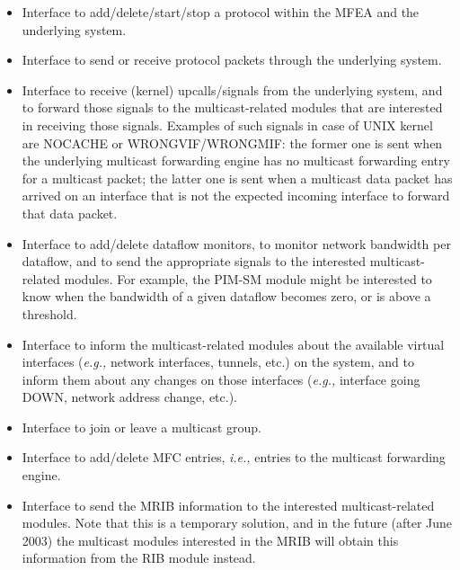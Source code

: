 \documentclass[11pt]{article}
\newcommand{\ie}{\emph{i.e.,}\xspace}
\newcommand{\eg}{\emph{e.g.,}\xspace}
\begin{document}
\begin{itemize}

  \item Interface to add/delete/start/stop a protocol within the MFEA
  and the underlying system.

  \item Interface to send or receive protocol packets through the
  underlying system.

  \item Interface to receive (kernel) upcalls/signals from the
  underlying system, and to forward those signals to the
  multicast-related modules that are interested in receiving those
  signals. Examples of such signals in case of UNIX kernel are NOCACHE or
  WRONGVIF/WRONGMIF: the former one is sent when the underlying multicast
  forwarding engine has no multicast forwarding entry for a multicast
  packet; the latter one is sent when a multicast data packet has
  arrived on an interface that is not the expected incoming interface to
  forward that data packet.

  \item Interface to add/delete dataflow monitors, to monitor network
  bandwidth per dataflow, and to send the appropriate signals to the
  interested multicast-related modules. For example, the PIM-SM module
  might be interested to know when the bandwidth of a given dataflow becomes
  zero, or is above a threshold.

  \item Interface to inform the multicast-related modules about the
  available virtual interfaces (\eg network interfaces, tunnels, etc.) on
  the system, and to inform them about any changes on those interfaces
  (\eg interface going DOWN, network address change, etc.).

  \item Interface to join or leave a multicast group.

  \item Interface to add/delete MFC entries, \ie entries to the
  multicast forwarding engine.

  \item Interface to send the MRIB information to the interested
  multicast-related modules. Note that this is a temporary solution, and
  in the future (after June 2003) the multicast modules interested in
  the MRIB will obtain this information from the RIB module instead.

\end{itemize}
\end{document}
